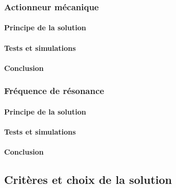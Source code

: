 \subsubsection{Actionneur mécanique}
\paragraph{Principe de la solution}

\paragraph{Tests et simulations}

\paragraph{Conclusion}

\subsubsection{Fréquence de résonance}
\paragraph{Principe de la solution}

\paragraph{Tests et simulations}

\paragraph{Conclusion}


\subsection{Critères et choix de la solution}
